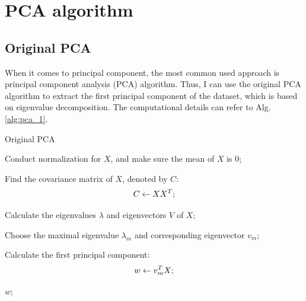 \documentclass[12pt,a4paper]{article}
\theoremstyle{definition}
\begin{document}
\noindent
\noindent{}

\section{PCA algorithm}

\subsection{Original PCA}
When it comes to principal component, the most common used approach is principal component analysis (PCA) algorithm. Thus, I can use the original PCA algorithm to extract the first principal component of the dataset, which is based on eigenvalue decomposition. The computational details can refer to Alg. \ref{alg:pca_1}.

\vspace{0.01\linewidth}
\begin{algorithm}[H]
	\caption{Original PCA}
	\label{alg:pca_1}
	\vspace{0.25\baselineskip}
	
	
	Conduct normalization for $X$, and make sure the mean of $X$ is 0;
	
	Find the covariance matrix of $X$, denoted by $C$:
	\begin{equation*}
		\centering
		C \leftarrow XX^{T};
	\end{equation*}
	
	Calculate the eigenvalues $\lambda$ and eigenvectors $V$ of $X$;
	
	Choose the maximal eigenvalue $\lambda_{m}$ and corresponding eigenvector $v_{m}$;
	
	Calculate the first principal component:
	\begin{equation*}
		\centering
		w \leftarrow v_{m}^{T}X;
	\end{equation*}
	
	\Return $w$;
\end{algorithm}
\vspace{0.01\linewidth}
\end{document}
